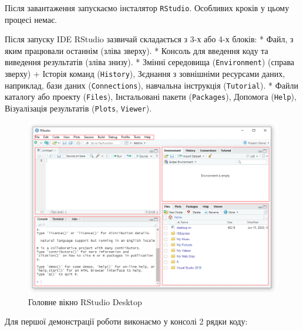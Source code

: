 \documentclass[
]{book}
\begin{document}
Після завантаження запускаємо інсталятор \texttt{RStudio}. Особливих кроків у цьому процесі немає.

Після запуску IDE RStudio зазвичай складається з 3-х або 4-х блоків:
* Файл, з яким працювали останнім (зліва зверху).
* Консоль для введення коду та виведення результатів (зліва знизу).
* Змінні середовища (\texttt{Environment}) (справа зверху) + Історія команд (\texttt{History}), Зєднання з зовнішніми ресурсами даних, наприклад, бази даних (\texttt{Connections}), навчальна інструкція (\texttt{Tutorial}).
* Файли каталогу або проекту (\texttt{Files}), Інстальовані пакети (\texttt{Packages}), Допомога (\texttt{Help}), Візуалізація результатів (\texttt{Plots}, \texttt{Viewer}).

\begin{figure}
\includegraphics[width=13.86in]{images/chapter1/rstudio_3} \caption{Головне вікно RStudio Desktop}\label{fig:unnamed-chunk-15}
\end{figure}

Для першої демонстрації роботи виконаємо у консолі 2 рядки коду:
\end{document}
